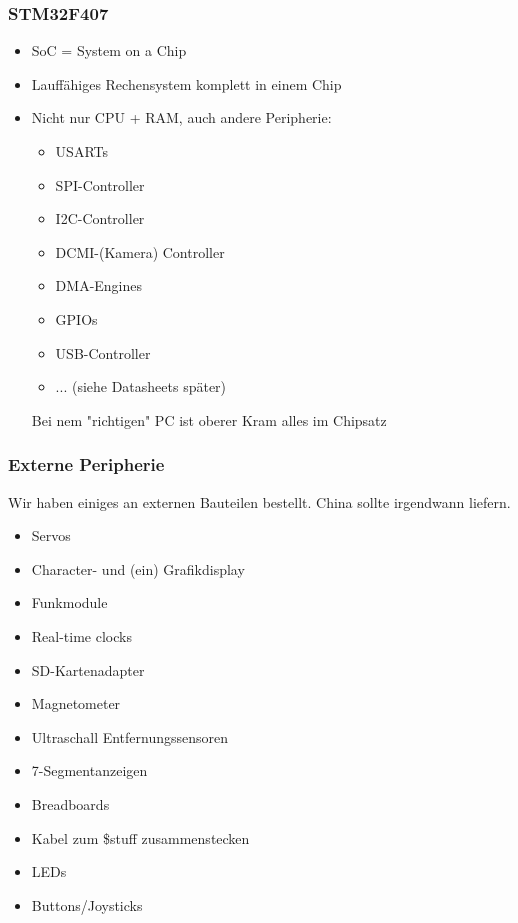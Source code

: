 \documentclass[ngerman,compress]{beamer}
\begin{document}
\begin{frame}
	\frametitle{STM32F407}
	\begin{itemize}
		\item SoC = System on a Chip
		\item Lauffähiges Rechensystem komplett in einem Chip
		\item Nicht nur CPU + RAM, auch andere Peripherie:
		\begin{itemize}
			\item USARTs
			\item SPI-Controller
			\item I2C-Controller
			\item DCMI-(Kamera) Controller
			\item DMA-Engines
			\item GPIOs
			\item USB-Controller
			\item ... (siehe Datasheets später)
		\end{itemize}
		Bei nem "richtigen" PC ist oberer Kram alles im Chipsatz
	\end{itemize}
\end{frame}

\begin{frame}
	\frametitle{Externe Peripherie}
	Wir haben einiges an externen Bauteilen bestellt. China sollte irgendwann liefern.
	\begin{itemize}
		\item Servos
		\item Character- und (ein) Grafikdisplay
		\item Funkmodule
		\item Real-time clocks
		\item SD-Kartenadapter
		\item Magnetometer
		\item Ultraschall Entfernungssensoren
		\item 7-Segmentanzeigen
		\item Breadboards
		\item Kabel zum \$stuff zusammenstecken
		\item LEDs
		\item Buttons/Joysticks
	\end{itemize}
\end{frame}
\end{document}
